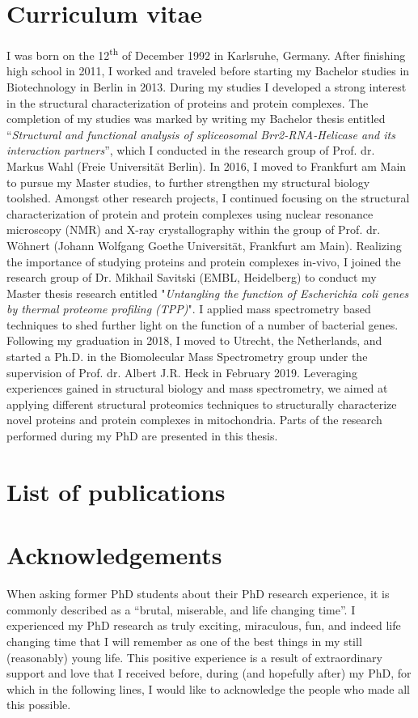 \section{Curriculum vitae}
I was born on the 12\textsuperscript{th} of December 1992 in Karlsruhe, Germany. After finishing high school in 2011, I worked and traveled before starting my Bachelor studies in Biotechnology in Berlin in 2013. During my studies I developed a strong interest in the structural characterization of proteins and protein complexes. The completion of my studies was marked by writing my Bachelor thesis entitled “\emph{Structural and functional analysis of spliceosomal Brr2-RNA-Helicase and its interaction partners}”, which I conducted in the research group of Prof. dr. Markus Wahl (Freie Universität Berlin). In 2016, I moved to Frankfurt am Main to pursue my Master studies, to further strengthen my structural biology toolshed. Amongst other research projects, I continued focusing on the structural characterization of protein and protein complexes using nuclear resonance microscopy (NMR) and X-ray crystallography within the group of Prof. dr. Wöhnert (Johann Wolfgang Goethe Universität, Frankfurt am Main). Realizing the importance of studying proteins and protein complexes in-vivo, I joined the research group of Dr. Mikhail Savitski (EMBL, Heidelberg) to conduct my Master thesis research entitled "\emph{Untangling the function of Escherichia coli genes by thermal proteome profiling (TPP)}". I applied mass spectrometry based techniques to shed further light on the function of a number of bacterial genes. Following my graduation in 2018, I moved to Utrecht, the Netherlands, and started a Ph.D. in the Biomolecular Mass Spectrometry group under the supervision of Prof. dr. Albert J.R. Heck in February 2019. Leveraging experiences gained in structural biology and mass spectrometry, we aimed at applying different structural proteomics techniques to structurally characterize novel proteins and protein complexes in mitochondria. Parts of the research performed during my PhD are presented in this thesis.
\clearpage
\section{List of publications}
\nocite{*}


\clearpage
\section{Acknowledgements}
When asking former PhD students about their PhD research experience, it is commonly described as a “brutal, miserable, and life changing time”. I experienced my PhD research as truly exciting, miraculous, fun, and indeed life changing time that I will remember as one of the best things in my still (reasonably) young life. This positive experience is a result of extraordinary support and love that I received before, during (and hopefully after) my PhD, for which in the following lines, I would like to acknowledge the people who made all this possible.

